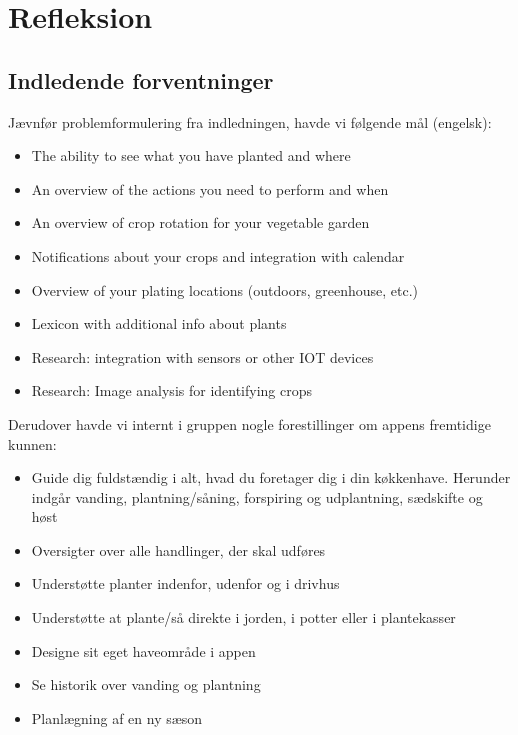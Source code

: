 \section{Refleksion}
\label{refleksion}

\subsection{Indledende forventninger}
Jævnfør problemformulering fra indledningen, havde vi følgende mål (engelsk):

\begin{itemize}
        \item
    The ability to see what you have planted and where
        \item
    An overview of the actions you need to perform and when
        \item
    An overview of crop rotation for your vegetable garden
        \item
    Notifications about your crops and integration with calendar
        \item
    Overview of your plating locations (outdoors, greenhouse, etc.)
        \item
    Lexicon with additional info about plants 
        \item
    Research: integration with sensors or other IOT devices
        \item
    Research: Image analysis for identifying crops
\end{itemize}

Derudover havde vi internt i gruppen nogle forestillinger om appens fremtidige kunnen:

\begin{itemize}
    \item Guide dig fuldstændig i alt, hvad du foretager dig i din køkkenhave. Herunder indgår vanding, plantning/såning, forspiring og udplantning, sædskifte og høst
    \item Oversigter over alle handlinger, der skal udføres
    \item Understøtte planter indenfor, udenfor og i drivhus
    \item Understøtte at plante/så direkte i jorden, i potter eller i plantekasser
    \item Designe sit eget haveområde i appen
    \item Se historik over vanding og plantning
    \item Planlægning af en ny sæson
\end{itemize}

